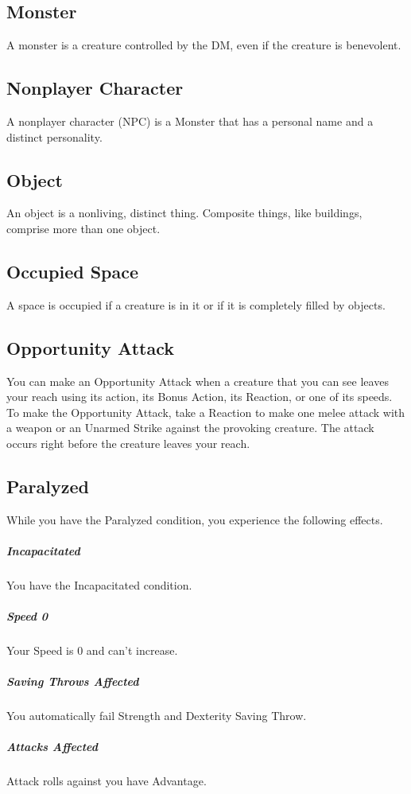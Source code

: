 \documentclass[10pt,a4paper,twoside,bg=print,twocolumn,openany,nodeprecatedcode]{dndarticle}
\begin{document}
\subsection{Monster}
A monster is a creature controlled by the DM, even if the creature is benevolent.

\subsection{Nonplayer Character}
A nonplayer character (NPC) is a Monster that has a personal name and a distinct personality.

\subsection{Object}
An object is a nonliving, distinct thing. Composite things, like buildings, comprise more than one object.

\subsection{Occupied Space}
A space is occupied if a creature is in it or if it is completely filled by objects.

\subsection{Opportunity Attack}
You can make an Opportunity Attack when a creature that you can see leaves your reach using its action, its Bonus Action, its Reaction, or one of its speeds. To make the Opportunity Attack, take a Reaction to make one melee attack with a weapon or an Unarmed Strike against the provoking creature. The attack occurs right before the creature leaves your reach.

\subsection{Paralyzed}
While you have the Paralyzed condition, you experience the following effects.

\subparagraph{Incapacitated}
You have the Incapacitated condition.

\subparagraph{Speed 0}
Your Speed is 0 and can't increase.

\subparagraph{Saving Throws Affected}
You automatically fail Strength and Dexterity Saving Throw.

\subparagraph{Attacks Affected}
Attack rolls against you have Advantage.
\end{document}
